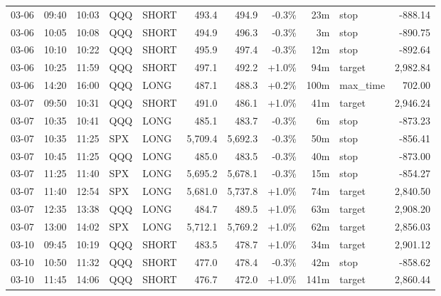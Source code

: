\documentclass[11pt,a4paper,twoside]{article}
\begin{document}
\begin{center}
\begin{longtable}{>{\color{txtmain}}l l l l l r r r r >{\color{txtmain}}l r}
03-06 & 09:40 & 10:03 & QQQ & SHORT & 493.4 & 494.9 & \textcolor{lossred}{-0.3\%} & 23m & stop & \textcolor{lossred}{-888.14} \\
03-06 & 10:05 & 10:08 & QQQ & SHORT & 494.9 & 496.3 & \textcolor{lossred}{-0.3\%} & 3m & stop & \textcolor{lossred}{-890.75} \\
03-06 & 10:10 & 10:22 & QQQ & SHORT & 495.9 & 497.4 & \textcolor{lossred}{-0.3\%} & 12m & stop & \textcolor{lossred}{-892.64} \\
03-06 & 10:25 & 11:59 & QQQ & SHORT & 497.1 & 492.2 & \textcolor{wingreen}{+1.0\%} & 94m & target & \textcolor{wingreen}{2,982.84} \\
03-06 & 14:20 & 16:00 & QQQ & LONG & 487.1 & 488.3 & \textcolor{wingreen}{+0.2\%} & 100m & max\_time & \textcolor{wingreen}{702.00} \\
03-07 & 09:50 & 10:31 & QQQ & SHORT & 491.0 & 486.1 & \textcolor{wingreen}{+1.0\%} & 41m & target & \textcolor{wingreen}{2,946.24} \\
03-07 & 10:35 & 10:41 & QQQ & LONG & 485.1 & 483.7 & \textcolor{lossred}{-0.3\%} & 6m & stop & \textcolor{lossred}{-873.23} \\
03-07 & 10:35 & 11:25 & SPX & LONG & 5,709.4 & 5,692.3 & \textcolor{lossred}{-0.3\%} & 50m & stop & \textcolor{lossred}{-856.41} \\
03-07 & 10:45 & 11:25 & QQQ & LONG & 485.0 & 483.5 & \textcolor{lossred}{-0.3\%} & 40m & stop & \textcolor{lossred}{-873.00} \\
03-07 & 11:25 & 11:40 & SPX & LONG & 5,695.2 & 5,678.1 & \textcolor{lossred}{-0.3\%} & 15m & stop & \textcolor{lossred}{-854.27} \\
03-07 & 11:40 & 12:54 & SPX & LONG & 5,681.0 & 5,737.8 & \textcolor{wingreen}{+1.0\%} & 74m & target & \textcolor{wingreen}{2,840.50} \\
03-07 & 12:35 & 13:38 & QQQ & LONG & 484.7 & 489.5 & \textcolor{wingreen}{+1.0\%} & 63m & target & \textcolor{wingreen}{2,908.20} \\
03-07 & 13:00 & 14:02 & SPX & LONG & 5,712.1 & 5,769.2 & \textcolor{wingreen}{+1.0\%} & 62m & target & \textcolor{wingreen}{2,856.03} \\
03-10 & 09:45 & 10:19 & QQQ & SHORT & 483.5 & 478.7 & \textcolor{wingreen}{+1.0\%} & 34m & target & \textcolor{wingreen}{2,901.12} \\
03-10 & 10:50 & 11:32 & QQQ & SHORT & 477.0 & 478.4 & \textcolor{lossred}{-0.3\%} & 42m & stop & \textcolor{lossred}{-858.62} \\
03-10 & 11:45 & 14:06 & QQQ & SHORT & 476.7 & 472.0 & \textcolor{wingreen}{+1.0\%} & 141m & target & \textcolor{wingreen}{2,860.44} \\

\end{longtable}
\end{center}
\end{document}
